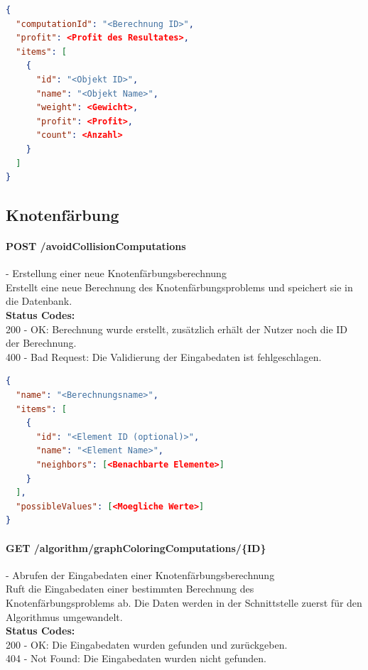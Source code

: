 \begin{lstlisting}[language=JSON, caption=Beispiel eines Endresultates für das Rucksack Problem, label=lst:solution_knapsack]  
{
  "computationId": "<Berechnung ID>",
  "profit": <Profit des Resultates>,
  "items": [
    {
      "id": "<Objekt ID>",
      "name": "<Objekt Name>",
      "weight": <Gewicht>,
      "profit": <Profit>,
      "count": <Anzahl>
    }
  ]
}
\end{lstlisting}

%
%
%
%

\subsection{Knotenfärbung}

\paragraph{POST /avoidCollisionComputations} - Erstellung einer neue Knotenfärbungsberechnung\mbox{}\\
Erstellt eine neue Berechnung des Knotenfärbungsproblems und speichert sie in die Datenbank.\\
\textbf{Status Codes:}\\
200 - OK: Berechnung wurde erstellt, zusätzlich erhält der Nutzer noch die ID der Berechnung.\\
400 - Bad Request: Die Validierung der Eingabedaten ist fehlgeschlagen.\\

\begin{lstlisting}[language=JSON, caption=Beispiel einer Eingabe für das Knotenfärbungsproblem, label=lst:input_graphcoloring]  
{
  "name": "<Berechnungsname>",
  "items": [
    {
      "id": "<Element ID (optional)>",
      "name": "<Element Name>",
      "neighbors": [<Benachbarte Elemente>]
    }
  ],
  "possibleValues": [<Moegliche Werte>]
}
\end{lstlisting}

\paragraph{GET /algorithm/graphColoringComputations/\{ID\}} - Abrufen der Eingabedaten einer Knotenfärbungsberechnung\mbox{}\\
Ruft die Eingabedaten einer bestimmten Berechnung des Knotenfärbungsproblems ab. Die Daten werden in der Schnittstelle zuerst für den Algorithmus umgewandelt.\\
\textbf{Status Codes:}\\
200 - OK: Die Eingabedaten wurden gefunden und zurückgeben.\\
404 - Not Found: Die Eingabedaten wurden nicht gefunden.\\

